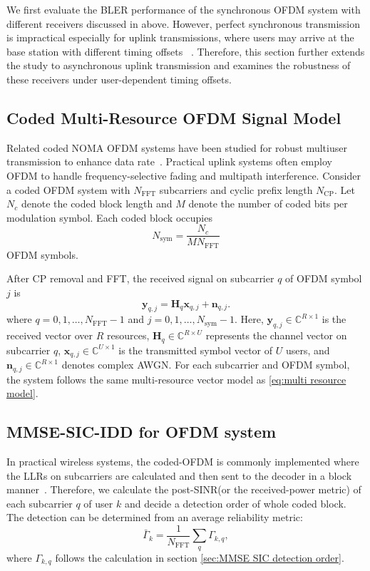 We first evaluate the BLER performance of the synchronous OFDM system with different receivers discussed in above. However, perfect synchronous transmission is impractical especially for uplink transmissions, where users may arrive at the base station with different timing offsets ~\cite{haci2017performance}. Therefore, this section further extends the study to asynchronous uplink transmission and examines the robustness of these receivers under user-dependent timing offsets.

\subsection{Coded Multi-Resource OFDM Signal Model}
Related coded NOMA OFDM systems have been studied for robust multiuser transmission to enhance data rate~\cite{li2013advanced, saraereh2019efficient, lin2024slotted}.
Practical uplink systems often employ OFDM to handle frequency-selective fading and multipath interference. 
Consider a coded OFDM system with $N_{\mathrm{FFT}}$ subcarriers and cyclic prefix length $N_{\mathrm{CP}}$. Let $N_c$ denote the coded block length and $M$ denote the number of coded bits per modulation symbol. Each coded block occupies
\begin{equation}
    N_{\mathrm{sym}}
    =
    \frac{N_c}{MN_{\mathrm{FFT}}}
\end{equation}
OFDM symbols.

After CP removal and FFT, the received signal on subcarrier $q$ of OFDM symbol $j$ is
\begin{equation}
    \bm{y}_{q,j}
    =
    \bm{H}_{q}\bm{x}_{q,j}+\bm{n}_{q,j}.
    \label{eq:ofdm-subcarrier-model}
\end{equation}
where $q=0,1,\ldots,N_{\mathrm{FFT}}-1$ and $j=0,1,\ldots,N_{\mathrm{sym}}-1$. Here, $\bm{y}_{q,j}\in\mathbb{C}^{R\times 1}$ is the received vector over $R$ resources, 
$\bm{H}_{q}\in\mathbb{C}^{R\times U}$ represents the channel vector on subcarrier $q$, 
$\bm{x}_{q,j}\in\mathbb{C}^{U\times 1}$ is the transmitted symbol vector of $U$ users, 
and $\bm{n}_{q,j}\in\mathbb{C}^{R\times 1}$ denotes complex AWGN. For each subcarrier and OFDM symbol, the system follows the same multi-resource vector model as \eqref{eq:multi resource model}.

\subsection{MMSE-SIC-IDD for OFDM system}
In practical wireless systems, the coded-OFDM is commonly implemented where the LLRs on subcarriers are calculated and then sent to the decoder in a block manner~\cite{csahin2024ofdm}. Therefore, we calculate the post-SINR(or the received-power metric) of each subcarrier $q$ of user $k$ and decide a detection order of whole coded block. 
The detection can be determined from an average reliability metric:
\begin{equation}
    \bar{\Gamma}_{k}
    =
    \frac{1}{N_{\mathrm{FFT}}}
    \sum_{q}
    \Gamma_{k,q},
    \label{eq:ofdm-average-post-sinr}
\end{equation}
where $\Gamma_{k,q}$ follows the calculation in section \ref{sec:MMSE SIC detection order}.

